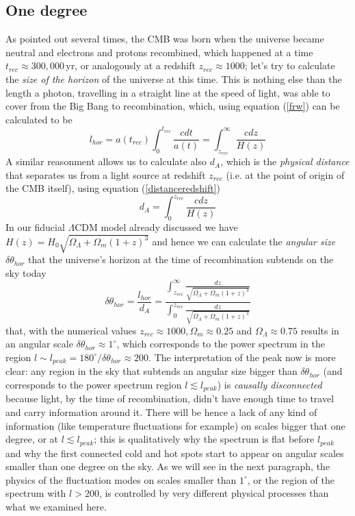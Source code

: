 \documentclass[11pt, a4paper,oneside,openright]{book}
\numberwithin{equation}{section}
\begin{document}
\subsection{One degree}
As pointed out several times, the CMB was born when the universe became neutral and electrons and protons recombined, which happened at a time $t_{rec}\approx 300,000\,$yr, or analogously at a redshift $z_{rec}\approx 1000$; let's try to calculate the \textit{size of the horizon} of the universe at this time. This is nothing else than the length a photon, travelling in a straight line at the speed of light, was able to cover from the Big Bang to recombination, which, using equation (\ref{frw}) can be calculated to be
\begin{equation}
l_{hor}=a(t_{rec})\int_0^{t_{rec}}\frac{cdt}{a(t)}=\int_{z_{rec}}^\infty\frac{cdz}{H(z)}
\end{equation} 
A similar reasonment allows us to calculate also $d_A$, which is the \textit{physical distance} that separates us from a light source at redshift $z_{rec}$ (i.e. at the point of origin of the CMB itself), using equation (\ref{distanceredshift})
\begin{equation}
d_A=\int_0^{z_{rec}}\frac{cdz}{H(z)}
\end{equation} 
In our fiducial $\Lambda$CDM model already discussed we have $H(z)=H_0\sqrt{\Omega_\Lambda + \Omega_m(1+z)^3}$ and hence we can calculate the \textit{angular size} $\delta \theta_{hor}$ that the universe's horizon at the time of recombination subtends on the sky today
\begin{equation}
\delta\theta_{hor}=\frac{l_{hor}}{d_A}=\frac{\int_{z_{rec}}^\infty\frac{dz}{\sqrt{\Omega_\Lambda + \Omega_m(1+z)^3}}}{\int_{0}^{z_{rec}}\frac{dz}{\sqrt{\Omega_\Lambda + \Omega_m(1+z)^3}}}
\end{equation}
that, with the numerical values $z_{rec}\approx 1000, \Omega_m\approx 0.25$ and $\Omega_\Lambda\approx 0.75$ results in an angular scale $\delta\theta_{hor}\approx 1^\circ$, which corresponds to the power spectrum in the region $l\sim l_{peak}=180^\circ/\delta\theta_{hor}\approx 200$. The interpretation of the peak now is more clear: any region in the sky that subtends an angular size bigger than $\delta\theta_{hor}$ (and corresponds to the power spectrum region $l\lesssim l_{peak}$) is \textit{causally disconnected} because light, by the time of recombination, didn't have enough time to travel and carry information around it. There will be hence a lack of any kind of information (like temperature fluctuations for example) on scales bigger that one degree, or at $l\lesssim l_{peak}$;  this is qualitatively why the spectrum is flat before $l_{peak}$ and why the first connected cold and hot spots start to appear on angular scales smaller than one degree on the sky. As we will see in the next paragraph, the 
physics of the fluctuation modes on scales smaller than $1^\circ$, or the region of the spectrum with $l>200$, is controlled by very different physical processes than what we examined here. 
\end{document}
